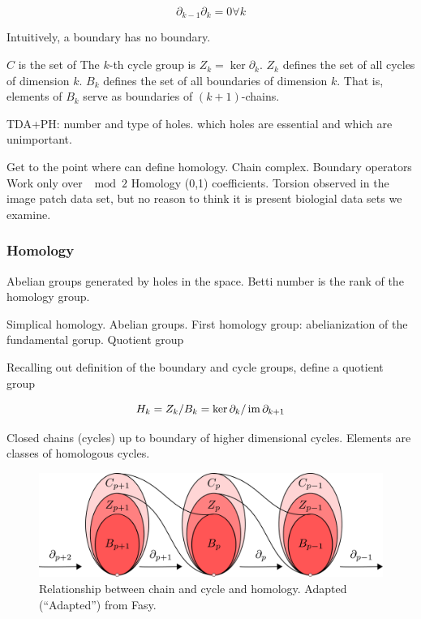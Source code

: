 \begin{equation}
\partial_{k-1}\partial_{k} = 0 \forall k
\end{equation}

Intuitively, a boundary has no boundary.

$C$ is the set of 
The $k$-th cycle group is $Z_{k}=\ker \partial_{k}$.
$Z_{k}$ defines the set of all cycles of dimension $k$.
$B_{k}$ defines the set of all boundaries of dimension $k$.
That is, elements of $B_{k}$ serve as boundaries of $(k+1)$-chains.

TDA+PH: number and type of holes. which holes are essential and which are unimportant.

Get to the point where can define homology.
Chain complex.
Boundary operators
Work only over $\mod 2$ Homology (0,1) coefficients.
Torsion observed in the image patch data set, but no reason to think it is present biologial data sets we examine.

\begin{figure}
\centering
\caption[]{}
\label{background:fig:boundary_example}
\end{figure}

\subsubsection{Homology}

Abelian groups generated by holes in the space.
Betti number is the rank of the homology group.

Simplical homology.
Abelian groups.
First homology group: abelianization of the fundamental gorup.
Quotient group

Recalling out definition of the boundary and cycle groups, define a quotient group

\begin{equation}
H_{k} = Z_{k} / B_{k} = \ker\partial_{k} / \operatorname{im}\partial_{k+1}
\end{equation}

Closed chains (cycles) up to boundary of higher dimensional cycles.
Elements are classes of homologous cycles.

\begin{figure}
\centering\includegraphics[width=\columnwidth]{./fig/FASY_chain_complexes.pdf}
\caption{Relationship between chain and cycle and homology. Adapted (``Adapted'') from Fasy.}
\label{fig:chain_complexes}
\end{figure}


